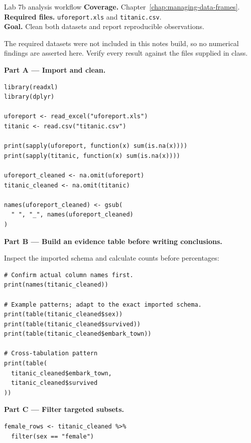 
\begin{labproject}{Lab 7b analysis workflow}
\textbf{Coverage.} Chapter~\ref{chap:managing-data-frames}.\\
\textbf{Required files.} \texttt{uforeport.xls} and \texttt{titanic.csv}.\\
\textbf{Goal.} Clean both datasets and report reproducible observations.

\begin{pitfall}
The required datasets were not included in this notes build, so no numerical findings are asserted here. Verify every result against the files supplied in class.
\end{pitfall}

\textbf{Part A --- Import and clean.}

\begin{lstlisting}[style=dsr]
library(readxl)
library(dplyr)

uforeport <- read_excel("uforeport.xls")
titanic <- read.csv("titanic.csv")

print(sapply(uforeport, function(x) sum(is.na(x))))
print(sapply(titanic, function(x) sum(is.na(x))))

uforeport_cleaned <- na.omit(uforeport)
titanic_cleaned <- na.omit(titanic)

names(uforeport_cleaned) <- gsub(
  " ", "_", names(uforeport_cleaned)
)
\end{lstlisting}

\textbf{Part B --- Build an evidence table before writing conclusions.}

Inspect the imported schema and calculate counts before percentages:

\begin{lstlisting}[style=dsr]
# Confirm actual column names first.
print(names(titanic_cleaned))

# Example patterns; adapt to the exact imported schema.
print(table(titanic_cleaned$sex))
print(table(titanic_cleaned$survived))
print(table(titanic_cleaned$embark_town))

# Cross-tabulation pattern
print(table(
  titanic_cleaned$embark_town,
  titanic_cleaned$survived
))
\end{lstlisting}

\textbf{Part C --- Filter targeted subsets.}

\begin{lstlisting}[style=dsr]
female_rows <- titanic_cleaned %>%
  filter(sex == "female")


\end{lstlisting}
\end{labproject}

